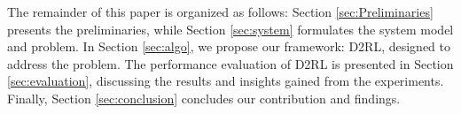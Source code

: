 The remainder of this paper is organized as follows: Section \ref{sec:Preliminaries} presents the preliminaries, while Section \ref{sec:system} formulates the system model and problem. 
In Section \ref{sec:algo}, we propose our framework: D2RL, designed to address the problem.
The performance evaluation of D2RL is presented in Section \ref{sec:evaluation}, discussing the results and insights gained from the experiments. Finally, Section \ref{sec:conclusion} concludes our contribution and findings.

\vspace{-6pt}